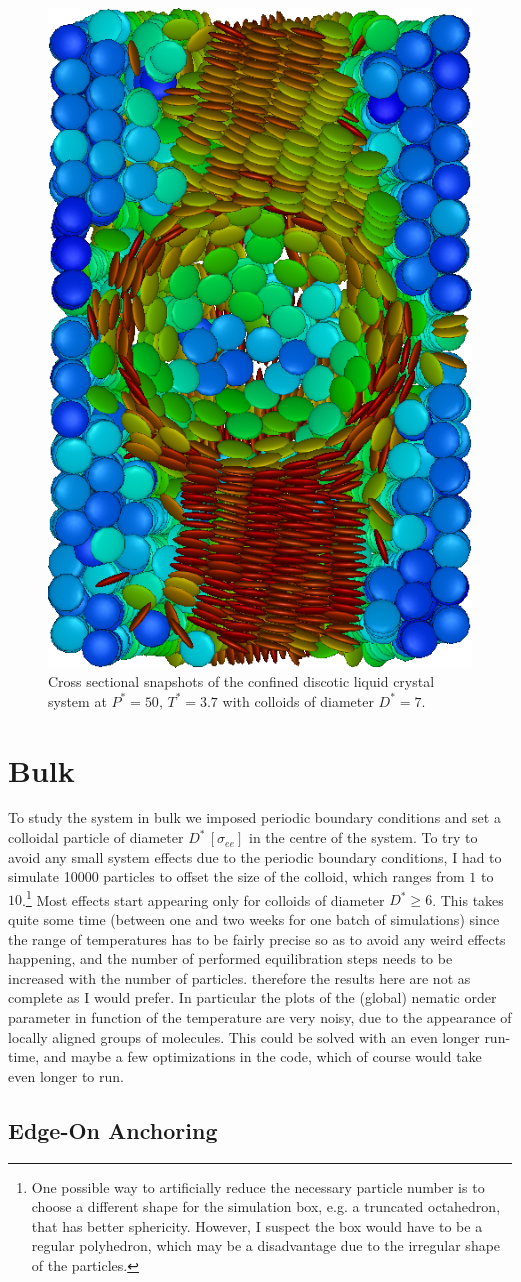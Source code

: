 \begin{figure}[H]
 \centering
 \includegraphics[width=.2\linewidth]{images/cfo_W8C56_D7.png}
\caption{Cross sectional snapshots of the confined discotic liquid crystal system at $P^* = 50$, $T^* = 3.7$ with colloids of diameter $D^*=7 $.}
 \label{fig:cfosnapshots}
\end{figure}



\section{Bulk}
\label{sec:Bulk}
To study the system in bulk we imposed periodic boundary conditions and set a colloidal particle of diameter $D^* \, [\sigma_{ee}]$ in the centre of the system. To try to avoid any small system effects due to the periodic boundary conditions, I had to simulate 10000 particles to offset the size of the colloid, which ranges from $1$ to $10$.\footnote{One possible way to artificially reduce the necessary particle number is to choose a different shape for the simulation box, e.g. a truncated octahedron, that has better sphericity. However, I suspect the box would have to be a regular polyhedron, which may be a disadvantage due to the irregular shape of the particles.} Most effects start appearing only for colloids of diameter $D^* \geq 6$. This takes quite some time (between one and two weeks for one batch of simulations) since the range of temperatures has to be fairly precise so as to avoid any weird effects happening, and the number of performed equilibration steps needs to be increased with the number of particles. therefore the results here are not as complete as I would prefer. In particular the plots of the (global) nematic order parameter in function of the temperature are very noisy, due to the appearance of locally aligned groups of molecules. This could be solved with an even longer run-time, and maybe a few optimizations in the code, which of course would take even longer to run.

\subsection{Edge-On Anchoring}

